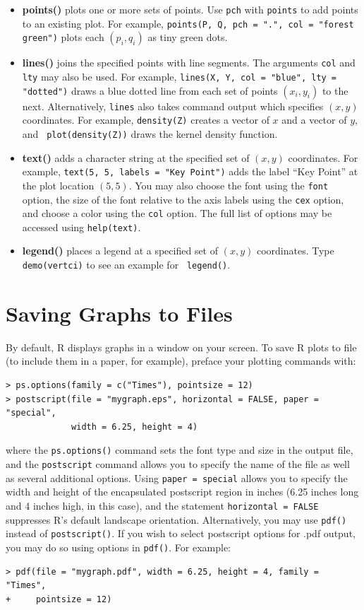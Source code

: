 \documentclass{article}
\begin{document}
\begin{itemize}
\item \textbf{points()} plots one or more sets of points.  Use
  \texttt{pch} with \texttt{points} to add points to an existing plot.
  For example, \texttt{points(P, Q, pch = ".", col = "forest green")}
  plots each $(p_i, q_i)$ as tiny green dots.
\item \textbf{lines()} joins the specified points with line segments.
  The arguments \texttt{col} and \texttt{lty} may also be used.  For
  example, \texttt{lines(X, Y, col = "blue", lty = "dotted")} draws a
  blue dotted line from each set of points $(x_i, y_i)$ to the next.
  Alternatively, \texttt{lines} also takes command output which
  specifies $(x, y)$ coordinates.  For example, \texttt{density(Z)}
  creates a vector of $x$ and a vector of $y$, and {\tt
    plot(density(Z))} draws the kernel density function.  
\item \textbf{text()} adds a character string at the specified set of
  $(x,y)$ coordinates.  For example, {\tt text(5, 5, labels = "Key
    Point")} adds the label ``Key Point'' at the plot location
  $(5,5)$.  You may also choose the font using the {\tt font} option,
  the size of the font relative to the axis labels using the {\tt cex}
  option, and choose a color using the {\tt col} option.  The full
  list of options may be accessed using {\tt help(text)}.   
\item \textbf{legend()} places a legend at a specified set of $(x,y)$
  coordinates.  Type {\tt demo(vertci)} to see an example for {\tt
    legend()}.  
\end{itemize}

\section{Saving Graphs to Files}\label{ss:output}

By default, R displays graphs in a window on your screen.  To save R
plots to file (to include them in a paper, for example), preface your
plotting commands with:
\begin{verbatim}
> ps.options(family = c("Times"), pointsize = 12)
> postscript(file = "mygraph.eps", horizontal = FALSE, paper = "special",
             width = 6.25, height = 4)
\end{verbatim}
where the \texttt{ps.options()} command sets the font type and size in
the output file, and the \texttt{postscript} command allows you to
specify the name of the file as well as several additional options.
Using {\tt paper = special} allows you to specify the width and height
of the encapsulated postscript region in inches (6.25 inches long and
4 inches high, in this case), and the statement \texttt{horizontal =
  FALSE} suppresses R's default landscape orientation.  Alternatively,
you may use {\tt pdf()} instead of {\tt postscript()}.  If you wish to
select postscript options for .pdf output, you may do so using options
in {\tt pdf()}.  For example:
\begin{verbatim}
> pdf(file = "mygraph.pdf", width = 6.25, height = 4, family = "Times", 
+     pointsize = 12)
\end{verbatim}
\end{document}
